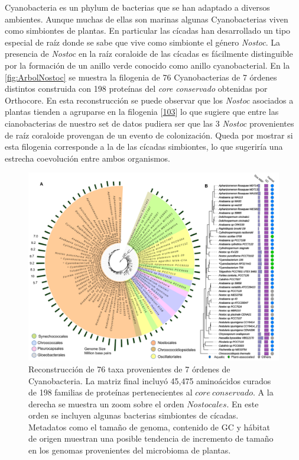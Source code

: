 \documentclass[12pt,twoside]{reedthesis}
\begin{document}
  Cyanobacteria es un phylum de bacterias que se han adaptado a diversos
  ambientes. Aunque muchas de ellas son marinas algunas Cyanobacterias
  viven como simbiontes de plantas. En particular las cícadas han
  desarrollado un tipo especial de raíz donde se sabe que vive como
  simbionte el género \emph{Nostoc}. La presencia de \emph{Nostoc} en la
  raíz coraloide de las cícadas es fácilmente distinguible por la
  formación de un anillo verde conocido como anillo cyanobacterial. En la
  \autoref{fig:ArbolNostoc} se muestra la filogenia de 76 Cyanobacterias
  de 7 órdenes distintos construida con 198 proteínas del \emph{core
  conservado} obtenidas por Orthocore. En esta reconstrucción se puede
  observar que los \emph{Nostoc} asociados a plantas tienden a agruparse
  en la filogenia
  {[}\protect\hyperlink{ref-gutierrez-garcia_cycad_2019}{103}{]} lo que
  sugiere que entre las cianobacterias de nuestro set de datos pudiera ser
  que las 3 \emph{Nostoc} provenientes de raíz coraloide provengan de un
  evento de colonización. Queda por mostrar si esta filogenia corresponde
  a la de las cícadas simbiontes, lo que sugeriría una estrecha
  coevolución entre ambos organismos.
  
  \begin{figure}[h!tbp]
  \centering
  \includegraphics[angle = 0,scale = .45]{chapter1/Nostoc.png}
  \caption[Arbol filogenético de $Nostoc$ construido utilizando  la selección de genes del $core~conservado$]{\footnotesize{Reconstrucción de 76 taxa provenientes de 7 órdenes de Cyanobacteria. La matriz final incluyó 45,475 aminoácidos curados de 198 familias de proteínas pertenecientes al $core~conservado$. A la derecha se muestra un zoom sobre el orden $Nostocales$. En este orden se incluyen algunas bacterias simbiontes de cícadas. Metadatos como el tamaño de genoma, contenido de GC y hábitat de origen muestran una posible tendencia de incremento de tamaño en los genomas provenientes del microbioma de plantas.}}
  \label{fig:ArbolNostoc}
  \end{figure}
  
\end{document}
